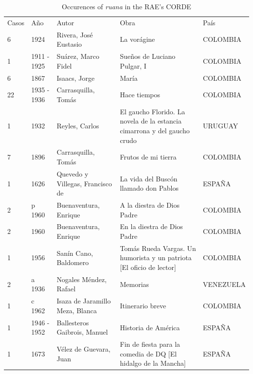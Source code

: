 \documentclass[12pt]{report}
\begin{document}
\begin{table}[ht]
	\centering
	{\tiny
		\caption{Occurences of \textit{ruana} in the RAE's CORDE}
		\label{my-label}
		\begin{tabular}{lllll}
			Casos & Año         & Autor                            & Obra                                                                                    & País      \\
			6     & 1924        & Rivera, José Eustasio            & La vorágine                                                                             & COLOMBIA  \\
			1     & 1911 - 1925 & Suárez, Marco Fidel              & Sueños de Luciano Pulgar, I                                                             & COLOMBIA  \\
			6     & 1867        & Isaacs, Jorge                    & María                                                                                   & COLOMBIA  \\
			22    & 1935 - 1936 & Carrasquilla, Tomás              & Hace tiempos                                                                            & COLOMBIA  \\
			1     & 1932        & Reyles, Carlos                   & El gaucho Florido. La novela de la estancia cimarrona y del gaucho crudo                & URUGUAY   \\
			7     & 1896        & Carrasquilla, Tomás              & Frutos de mi tierra                                                                     & COLOMBIA  \\
			1     & 1626        & Quevedo y Villegas, Francisco de & La vida del Buscón llamado don Pablos                                                   & ESPAÑA    \\
			2     & p 1960      & Buenaventura, Enrique            & A la diestra de Dios Padre                                                              & COLOMBIA  \\
			2     & 1960        & Buenaventura, Enrique            & En la diestra de Dios Padre                                                             & COLOMBIA  \\
			1     & 1956        & Sanín Cano, Baldomero            & Tomás Rueda Vargas. Un humorista y un patriota {[}El oficio de lector{]}                & COLOMBIA  \\
			2     & a 1936      & Nogales Méndez, Rafael           & Memorias                                                                                & VENEZUELA \\
			1     & c 1962      & Isaza de Jaramillo Meza, Blanca  & Itinerario breve                                                                        & COLOMBIA  \\
			1     & 1946 - 1952 & Ballesteros Gaibrois, Manuel     & Historia de América                                                                     & ESPAÑA    \\
			1     & 1673        & Vélez de Guevara, Juan           & Fin de fiesta para la comedia de DQ
			{[}El hidalgo de la Mancha{]} & ESPAÑA   
		\end{tabular}
	}
\end{table}
\end{document}
